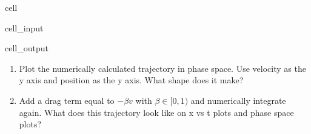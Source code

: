 \documentclass[letterpaper,10pt,english]{jupyterBook}
\begin{document}
\begin{sphinxuseclass}{cell}
\begin{sphinxVerbatimInput}
\begin{sphinxuseclass}{cell_input}
\begin{sphinxVerbatim}[commandchars=\\\{\}]
    
\PYG{p}{[}\PYG{p}{]}  
\end{sphinxVerbatim}

\end{sphinxuseclass}\end{sphinxVerbatimInput}
\begin{sphinxVerbatimOutput}

\begin{sphinxuseclass}{cell_output}
\noindent{}

\end{sphinxuseclass}\end{sphinxVerbatimOutput}

\end{sphinxuseclass}
\sphinxAtStartPar
{}
\begin{enumerate}
%
\item {} 
\sphinxAtStartPar
Plot the numerically calculated trajectory in phase space. Use velocity as the y axis and position as the y axis. What shape does it make?

\item {} 
\sphinxAtStartPar
Add a drag term equal to \(-\beta v\) with \(\beta \in [0,1)\) and numerically integrate again. What does this trajectory look like on x vs t plots and phase space plots?

\end{enumerate}
\end{document}
